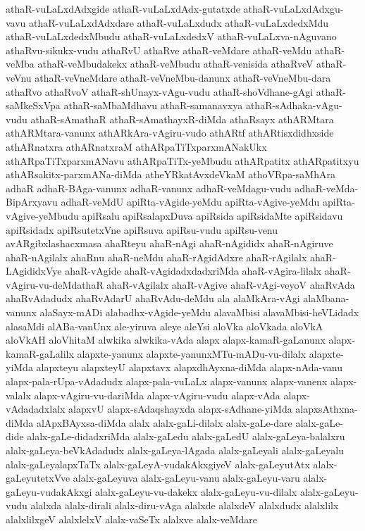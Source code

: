 {athaR-vuLaLxdAdxgide
athaR-vuLaLxdAdx-gutatxde
athaR-vuLaLxdAdxgu-vavu
athaR-vuLaLxdAdxdare
athaR-vuLaLxdudx
athaR-vuLaLxdedxMdu
athaR-vuLaLxdedxMbudu
athaR-vuLaLxdedxV
athaR-vuLaLxva-nAguvano
athaRvu-sikukx-vudu
athaRvU
athaRve
athaR-veMdare
athaR-veMdu
athaR-veMba
athaR-veMbudakekx
athaR-veMbudu
athaR-venisida
athaRveV
athaR-veVnu
athaR-veVneMdare
athaR-veVneMbu-danunx
athaR-veVneMbu-dara
athaRvo
athaRvoV
athaR-shUnayx-vAgu-vudu
athaR-shoVdhane-gAgi
athaR-saMkeSxVpa
athaR-saMbaMdhavu
athaR-samanavxya
athaR-sAdhaka-vAgu-vudu
athaR-sAmathaR
athaR-sAmathayxR-diMda
athaRsayx
athARMtara
athARMtara-vanunx
athARkAra-vAgiru-vudo
athARtf
athARtisxdidhxside
athARnatxra
athARnatxraM
athARpaTiTxparxmANakUkx
athARpaTiTxparxmANavu
athARpaTiTx-yeMbudu
athARpatitx
athARpatitxyu
athARsakitx-parxmANa-diMda
atheYRkatAvxdeVkaM
athoVRpa-saMhAra
adhaR
adhaR-BAga-vanunx
adhaR-vanunx
adhaR-veMdagu-vudu
adhaR-veMda-BipArxyavu
adhaR-veMdU
apiRta-vAgide-yeMdu
apiRta-vAgive-yeMdu
apiRta-vAgive-yeMbudu
apiRsalu
apiRsalapxDuva
apiRsida
apiRsidaMte
apiRsidavu
apiRsidadx
apiRsutetxVne
apiRsuva
apiRsu-vudu
apiRsu-venu
avARgibxlashacxmasa
ahaRteyu
ahaR-nAgi
ahaR-nAgididx
ahaR-nAgiruve
ahaR-nAgilalx
ahaRnu
ahaR-neMdu
ahaR-rAgidAdxre
ahaR-rAgilalx
ahaR-LAgididxVye
ahaR-vAgide
ahaR-vAgidadxdadxriMda
ahaR-vAgira-lilalx
ahaR-vAgiru-vu-deMdathaR
ahaR-vAgilalx
ahaR-vAgive
ahaR-vAgi-veyoV
ahaRvAda
ahaRvAdadudx
ahaRvAdarU
ahaRvAdu-deMdu
ala
alaMkAra-vAgi
alaMbana-vanunx
alaSayx-mADi
alabadhx-vAgide-yeMdu
alavaMbisi
alavaMbisi-heVLidadx
alasaMdi
alABa-vanUnx
ale-yiruva
aleye
aleYsi
aloVka
aloVkada
aloVkA
aloVkAH
aloVhitaM
alwkika
alwkika-vAda
alapx
alapx-kamaR-gaLanunx
alapx-kamaR-gaLalilx
alapxte-yanunx
alapxte-yanunxMTu-mADu-vu-dilalx
alapxte-yiMda
alapxteyu
alapxteyU
alapxtavx
alapxdhAyxna-diMda
alapx-nAda-vanu
alapx-pala-rUpa-vAdadudx
alapx-pala-vuLaLx
alapx-vanunx
alapx-vanenx
alapx-valalx
alapx-vAgiru-vu-dariMda
alapx-vAgiru-vudu
alapx-vAda
alapx-vAdadadxlalx
alapxvU
alapx-sAdaqshayxda
alapx-sAdhane-yiMda
alapxsAthxna-diMda
alApxBAyxsa-diMda
alalx
alalx-gaLi-dilalx
alalx-gaLe-dare
alalx-gaLe-dide
alalx-gaLe-didadxriMda
alalx-gaLedu
alalx-gaLedU
alalx-gaLeya-balalxru
alalx-gaLeya-beVkAdadudx
alalx-gaLeya-lAgada
alalx-gaLeyali
alalx-gaLeyalu
alalx-gaLeyalapxTaTx
alalx-gaLeyA-vudakAkxgiyeV
alalx-gaLeyutAtx
alalx-gaLeyutetxVve
alalx-gaLeyuva
alalx-gaLeyu-vanu
alalx-gaLeyu-varu
alalx-gaLeyu-vudakAkxgi
alalx-gaLeyu-vu-dakekx
alalx-gaLeyu-vu-dilalx
alalx-gaLeyu-vudu
alalxda
alalx-dirali
alalx-diru-vAga
alalxde
alalxdeV
alalxdudx
alalxlilx
alalxlilxgeV
alalxlelxV
alalx-vaSeTx
alalxve
alalx-veMdare
}
